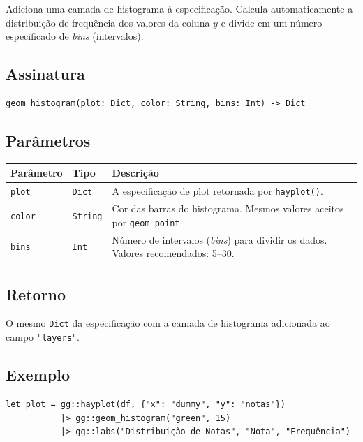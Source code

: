 \documentclass[12pt, a4paper, oneside]{book}
\newcommand{\code}[1]{\texttt{#1}}
\begin{document}
Adiciona uma camada de histograma à especificação. Calcula automaticamente
a distribuição de frequência dos valores da coluna $y$ e divide em um número
especificado de \textit{bins} (intervalos).

\subsection*{Assinatura}

\begin{lstlisting}[style=inline]
geom_histogram(plot: Dict, color: String, bins: Int) -> Dict
\end{lstlisting}

\subsection*{Parâmetros}

\begin{tabularx}{\textwidth}{@{}lL{2.5cm}X@{}}
  \toprule
  \textbf{Parâmetro} & \textbf{Tipo} & \textbf{Descrição} \\
  \midrule
  \code{plot}  & \code{Dict}   & A especificação de plot retornada por \code{hayplot()}. \\[4pt]
  \code{color} & \code{String} & Cor das barras do histograma. Mesmos valores aceitos por \code{geom\_point}. \\[4pt]
  \code{bins}  & \code{Int}    & Número de intervalos (\textit{bins}) para dividir os dados. Valores recomendados: 5--30. \\
  \bottomrule
\end{tabularx}

\subsection*{Retorno}

O mesmo \code{Dict} da especificação com a camada de histograma adicionada ao
campo \code{"layers"}.

\subsection*{Exemplo}

\begin{lstlisting}[caption={Histograma de distribuição}]
let plot = gg::hayplot(df, {"x": "dummy", "y": "notas"})
           |> gg::geom_histogram("green", 15)
           |> gg::labs("Distribuição de Notas", "Nota", "Frequência")
\end{lstlisting}
\end{document}
